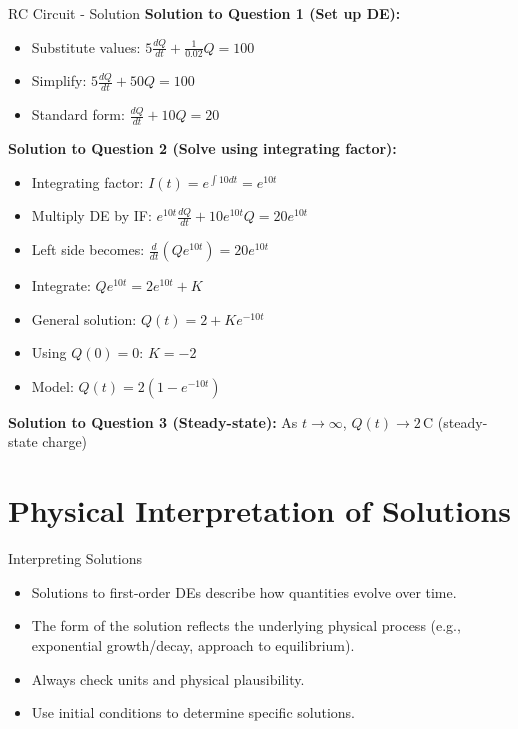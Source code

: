 \documentclass[10pt,aspectratio=169]{beamer}
\begin{document}
\begin{frame}{RC Circuit - Solution}
    \textbf{Solution to Question 1 (Set up DE):}
    \begin{itemize}
        \item Substitute values: $5\frac{dQ}{dt} + \frac{1}{0.02}Q = 100$
        \item Simplify: $5\frac{dQ}{dt} + 50Q = 100$
        \item Standard form: $\frac{dQ}{dt} + 10Q = 20$
    \end{itemize}
    
    \textbf{Solution to Question 2 (Solve using integrating factor):}
    \begin{itemize}
        \item Integrating factor: $I(t) = e^{\int 10 dt} = e^{10t}$
        \item Multiply DE by IF: $e^{10t}\frac{dQ}{dt} + 10e^{10t}Q = 20e^{10t}$
        \item Left side becomes: $\frac{d}{dt}(Qe^{10t}) = 20e^{10t}$
        \item Integrate: $Qe^{10t} = 2e^{10t} + K$
        \item General solution: $Q(t) = 2 + Ke^{-10t}$
        \item Using $Q(0) = 0$: $K = -2$
        \item Model: $Q(t) = 2(1 - e^{-10t})$
    \end{itemize}
    
    \textbf{Solution to Question 3 (Steady-state):}
    As $t \to \infty$, $Q(t) \to 2\,\mathrm{C}$ (steady-state charge)
\end{frame}

\section{Physical Interpretation of Solutions}
\begin{frame}{Interpreting Solutions}
    \begin{itemize}
        \item Solutions to first-order DEs describe how quantities evolve over time.
        \item The form of the solution reflects the underlying physical process (e.g., exponential growth/decay, approach to equilibrium).
        \item Always check units and physical plausibility.
        \item Use initial conditions to determine specific solutions.
    \end{itemize}
\end{frame}
\end{document}
